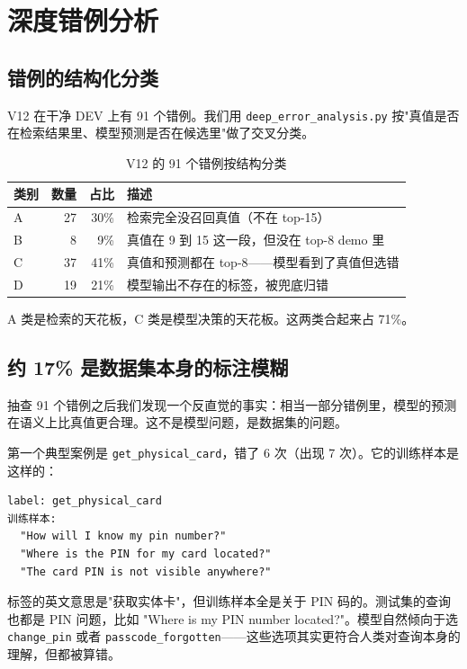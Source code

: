 \documentclass[11pt,a4paper]{article}
\begin{document}
\section{深度错例分析}
\label{sec:errors}

\subsection{错例的结构化分类}

V12 在干净 DEV 上有 91 个错例。我们用 \texttt{deep\_error\_analysis.py} 按"真值是否在检索结果里、模型预测是否在候选里"做了交叉分类。

\begin{table}[h]
\centering
\caption{V12 的 91 个错例按结构分类}
\small
\begin{tabular}{lrrl}
\toprule
类别 & 数量 & 占比 & 描述 \\
\midrule
A & 27 & 30\% & 检索完全没召回真值（不在 top-15）\\
B & 8  & 9\%  & 真值在 9 到 15 这一段，但没在 top-8 demo 里 \\
C & 37 & 41\% & 真值和预测都在 top-8——模型看到了真值但选错 \\
D & 19 & 21\% & 模型输出不存在的标签，被兜底归错 \\
\bottomrule
\end{tabular}
\end{table}

A 类是检索的天花板，C 类是模型决策的天花板。这两类合起来占 71\%。

\subsection{约 17\% 是数据集本身的标注模糊}

抽查 91 个错例之后我们发现一个反直觉的事实：相当一部分错例里，模型的预测在语义上比真值更合理。这不是模型问题，是数据集的问题。

第一个典型案例是 \texttt{get\_physical\_card}，错了 6 次（出现 7 次）。它的训练样本是这样的：

\begin{verbatim}
label: get_physical_card
训练样本:
  "How will I know my pin number?"
  "Where is the PIN for my card located?"
  "The card PIN is not visible anywhere?"
\end{verbatim}

标签的英文意思是"获取实体卡"，但训练样本全是关于 PIN 码的。测试集的查询也都是 PIN 问题，比如 "Where is my PIN number located?"。模型自然倾向于选 \texttt{change\_pin} 或者 \texttt{passcode\_forgotten}——这些选项其实更符合人类对查询本身的理解，但都被算错。
\end{document}
